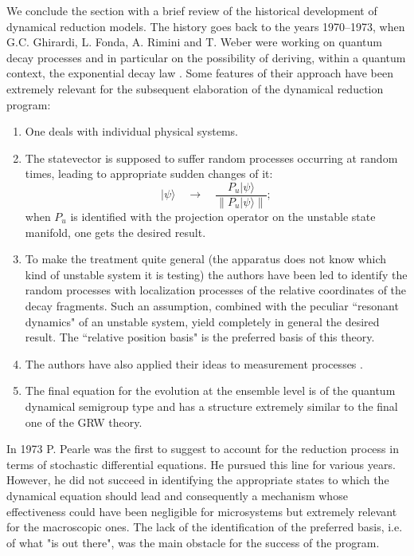 \documentclass[12pt]{article}
\begin{document}
We conclude the section with a brief review of the historical
development of dynamical reduction models. The history goes back
to the years 1970--1973, when G.C. Ghirardi, L. Fonda, A. Rimini and
T. Weber were working on quantum decay processes and in particular
on the possibility of deriving, within a quantum context, the
exponential decay law \cite{fons1,fons2}. Some features of their
approach have been extremely relevant for the subsequent elaboration of
the dynamical reduction program:
\begin{enumerate}
\item One deals with individual physical systems.
\item The statevector is supposed to suffer random processes
occurring at random times, leading to appropriate sudden changes
of it:
\[
|\psi\rangle \quad\longrightarrow\quad \frac{P_{u}|\psi
\rangle}{\|P_{u}|\psi\rangle\|};
\]
when $P_{u}$ is identified with the projection operator on the
unstable state manifold, one gets the desired result.
\item To make the treatment quite general (the apparatus does not
know which kind of unstable system it is testing) the authors have
been led to identify  the random processes with localization
processes of the relative coordinates of the decay fragments. Such
an assumption, combined with the peculiar ``resonant dynamics" of
an unstable system, yield completely in general the desired
result. The ``relative position basis" is the preferred basis of
this theory.
\item The authors have also applied their ideas to measurement
processes \cite{fons3}.
\item The final equation for the evolution at the ensemble level
is of the quantum dynamical semigroup type \cite{lin,gli} and has
a structure extremely similar to the final one of the GRW theory.
\end{enumerate}

In 1973 P. Pearle was the first to suggest to account for the
reduction process in terms of stochastic differential equations.
He pursued this line for various years. However, he did not
succeed in identifying the appropriate states to which the
dynamical equation should lead and consequently a mechanism whose
effectiveness could have been negligible for microsystems but
extremely relevant for the macroscopic ones. The lack of the
identification of the preferred basis, i.e. of what "is out
there", was the main obstacle for the success of the program.
\end{document}

